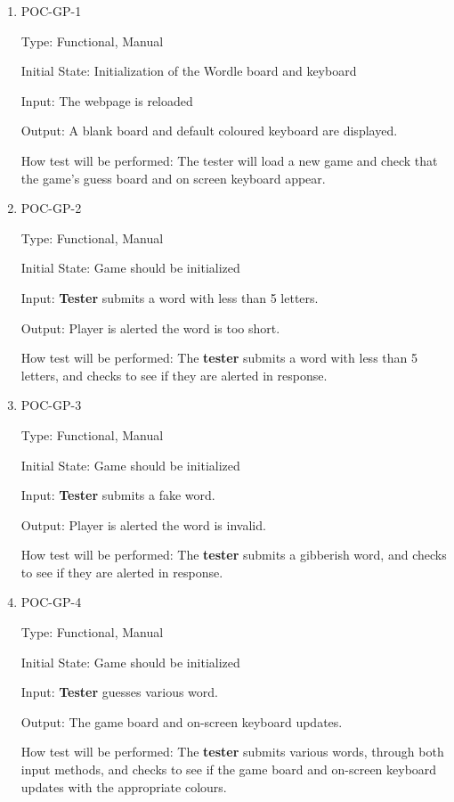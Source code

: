 \documentclass[12pt, titlepage]{article}
\begin{document}
\begin{enumerate}

\item{POC-GP-1}

Type: Functional, Manual
					
Initial State: Initialization of the Wordle board and keyboard
					
Input: The webpage is reloaded
					
Output: A blank board and default coloured keyboard are displayed.
					
How test will be performed: The tester will load a new game and check that the 
game's guess board and on screen keyboard appear.
					
\item{POC-GP-2}

Type: Functional, Manual
					
Initial State: Game should be initialized
					
Input: \textbf{Tester} submits a word with less than 5 letters.
					
Output: Player is alerted the word is too short.
					
How test will be performed: The \textbf{tester} submits a word with less than 5 letters,
and checks to see if they are alerted in response. 

\item{POC-GP-3}

Type: Functional, Manual
					
Initial State: Game should be initialized
					
Input: \textbf{Tester} submits a fake word.
					
Output: Player is alerted the word is invalid.
					
How test will be performed: The \textbf{tester} submits a gibberish word,
and checks to see if they are alerted in response. 

\item{POC-GP-4}

Type: Functional, Manual
					
Initial State: Game should be initialized
					
Input: \textbf{Tester} guesses various word.
					
Output: The game board and on-screen keyboard updates.
					
How test will be performed: The \textbf{tester} submits various words, 
through both input methods, and checks to see if the game board 
and on-screen keyboard updates with the appropriate colours. 


\end{enumerate}
\end{document}
